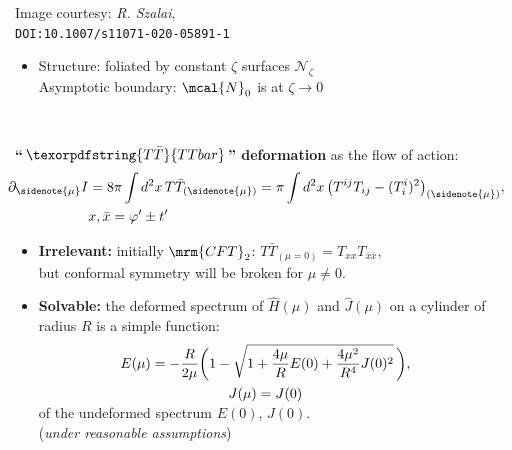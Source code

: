 \documentclass[10pt]{article}
\newcommand{\citations}[1]{{\footnotesize#1\par}}
\newcommand{\TTbar}{\texorpdfstring{\ensuremath{T\bar{T}}}{TTbar}\xspace}
\begin{document}
\begin{multicols}{3}
\begin{center}
	\vspace{-.3\baselineskip}\scriptsize
	Image courtesy: \textsl{R. Szalai},\\
	\tiny\texttt{DOI:10.1007/s11071-020-05891-1}

	\vspace{-.5\baselineskip}
\end{center}
\begin{itemize}
\item Structure: foliated by constant $\zeta$ surfaces ${\mathcal N}_\zeta$\\[.7ex]
Asymptotic boundary: $\mcal{N}_0$ is at $\zeta \to 0$
\\[1ex]
\citations{%
	\textcite{Fefferman:2007rka}\\
	\textcite{Banados:1992wn}%
}
\end{itemize}

\textbf{``\,$\TTbar$\,'' deformation} as the flow of action:
\begin{align}
\hspace{-1.5em}
	\partial_{\sidenote{\mu}} I &= {8 \pi} \int d^2x \, T\bar T_{(\sidenote{\mu})} = {\pi} \int d^2x\,\big( T^{ij}T_{ij}- (T^i_i)^2 \big)_{(\sidenote{\mu})},\notag\\
	&x, \bar{x} = \varphi' \pm t'
	\label{TTbardef}
\end{align}

\begin{itemize}

\item \textbf{Irrelevant:} initially $\mrm{CFT}_2$: $T\bar{T}_{(\mu = 0)} = T_{xx} T_{\bar{x}\bar{x}}$, \\
but conformal symmetry will be broken for $\mu \ne 0$.

\item \textbf{Solvable:} the deformed spectrum of $\hat{H}(\mu)$ and $\hat{J}(\mu)$ on a cylinder of radius $R$ is a simple function:
\begin{equation}
\hspace{-2em}
\begin{gathered}
	E(\mu) = - \frac{R }{ 2\mu } \bigg(1-\sqrt{1 + \frac{4\mu}{R} E(0) + \frac{4\mu^2}{R^4} J(0)^2 }
	\,\bigg), \\ J(\mu)=J(0) \\[-1.5ex]
\end{gathered} \label{ttbarspectrum}
\end{equation}
of the undeformed spectrum $E(0)$, $J(0)$.\\
(\textit{under reasonable assumptions})


\end{itemize}
\end{multicols}
\end{document}

